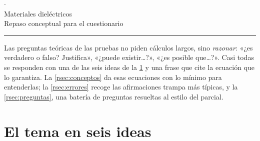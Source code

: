 \thispagestyle{plain}

\newenvironment{pregunta}[1]{%
  \refstepcounter{preg}\par\addvspace{0.9em}\noindent
  \begin{minipage}[t]{\textwidth}
  {\color{acentoC}\sffamily\bfseries P\thepreg.}\enspace{\bfseries #1}\par\nopagebreak\smallskip
  \leftskip=1.6em\noindent{\color{acentoA}\sffamily\small Respuesta.}\enspace\ignorespaces}%
  {\par\end{minipage}\par\addvspace{0.4em}}
\newcommand{\Ver}{\textcolor{verde}{\textbf{Verdadero}}}
\newcommand{\Fal}{\textcolor{cargapos}{\textbf{Falso}}}

\begin{center}
  {\small\color{tenue}\quad$\cdot$\quad{}}\\[1.0em]
  {\fuentetitulo\fontsize{22}{26}\selectfont Materiales dieléctricos}\\[0.5em]
  {\large Repaso conceptual para el cuestionario}\\[0.8em]
  {\color{acentoA}\rule{2.6cm}{0.6pt}}
\end{center}

\begin{consejo}
Las preguntas teóricas de las pruebas no piden cálculos largos, sino \emph{razonar}: «¿es verdadero o falso?
Justifica», «¿puede existir…?», «¿es posible que…?». Casi todas se responden con una de las seis ideas de la
\cref{rsec:ideas} y una frase que cite la ecuación que lo garantiza. La \cref{rsec:conceptos} da esas
ecuaciones con lo mínimo para entenderlas; la \cref{rsec:errores} recoge las afirmaciones trampa más típicas, y la
\cref{rsec:preguntas}, una batería de preguntas resueltas al estilo del parcial.
\end{consejo}

\section{El tema en seis ideas}\label{rsec:ideas}


